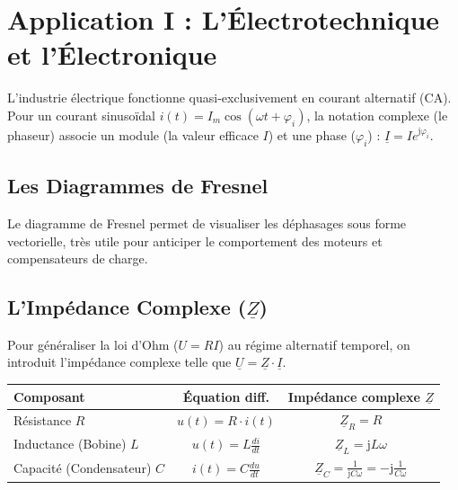 \documentclass[11pt,a4paper]{article}
\newcommand{\jc}{\mathrm{j}} %
\newcommand{\cpx}[1]{\underline{#1}} %
\begin{document}
\section{Application I : L'Électrotechnique et l'Électronique}

L'industrie électrique fonctionne quasi-exclusivement en courant alternatif (CA). Pour un courant sinusoïdal $i(t) = I_m \cos(\omega t + \varphi_i)$, la notation complexe (le phaseur) associe un module (la valeur efficace $I$) et une phase ($\varphi_i$) : $\cpx{I} = I e^{\jc \varphi_i}$.

\subsection{Les Diagrammes de Fresnel}
Le diagramme de Fresnel permet de visualiser les déphasages sous forme vectorielle, très utile pour anticiper le comportement des moteurs et compensateurs de charge.

\begin{center}
\end{center}

\subsection{L'Impédance Complexe ($\cpx{Z}$)}
Pour généraliser la loi d'Ohm ($U=RI$) au régime alternatif temporel, on introduit l'impédance complexe telle que $\cpx{U} = \cpx{Z} \cdot \cpx{I}$.

\begin{exemple}
\centering
\begin{tabular}{|l|c|c|}
\hline
\textbf{Composant} & \textbf{Équation diff.} & \textbf{Impédance complexe $\cpx{Z}$} \\
\hline
Résistance $R$ & $u(t) = R \cdot i(t)$ & $\cpx{Z}_R = R$ \\
Inductance (Bobine) $L$ & $u(t) = L \frac{di}{dt}$ & $\cpx{Z}_L = \jc L\omega$ \\
Capacité (Condensateur) $C$ & $i(t) = C \frac{du}{dt}$ & $\cpx{Z}_C = \frac{1}{\jc C\omega} = -\jc \frac{1}{C\omega}$ \\
\hline
\end{tabular}
\end{exemple}
\end{document}

